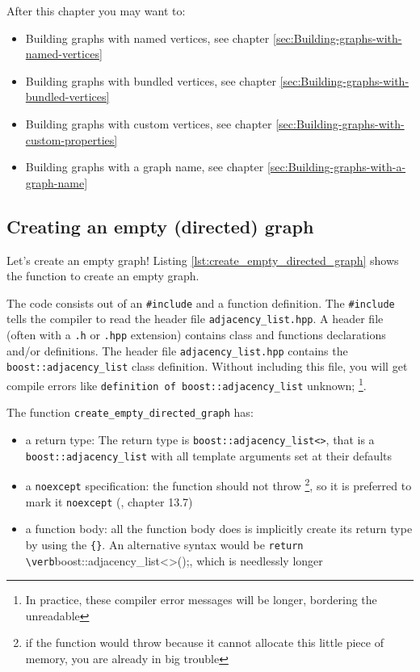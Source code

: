 After this chapter you may want to:

\begin{itemize}
  \item Building graphs with named vertices, 
    see chapter \ref{sec:Building-graphs-with-named-vertices}
  \item Building graphs with bundled vertices, 
    see chapter \ref{sec:Building-graphs-with-bundled-vertices}
  \item Building graphs with custom vertices,
    see chapter \ref{sec:Building-graphs-with-custom-properties}
  \item Building graphs with a graph name,
    see chapter \ref{sec:Building-graphs-with-a-graph-name}
\end{itemize}

\subsection{Creating an empty (directed) graph}
\label{subsec:create_empty_directed_graph}

Let's create an empty graph! 
Listing \ref{lst:create_empty_directed_graph} 
shows the function to create an empty graph.



The code consists out of an \verb;#include; and a function definition.
The \verb;#include; tells the compiler 
to read the header file \verb;adjacency_list.hpp;.
A header file (often with a \verb;.h; or \verb;.hpp; extension) 
contains class and functions declarations and/or definitions.
The header file \verb;adjacency_list.hpp; contains the 
\verb;boost::adjacency_list; class definition.
Without including this file, you will get compile errors like 
\verb;definition of boost::adjacency_list; unknown;
\footnote{
  In practice, these compiler error messages will be longer, bordering the unreadable
}. 

The function \verb;create_empty_directed_graph; has:

\begin{itemize}
  \item a return type: 
    The return type is \verb;boost::adjacency_list<>;, 
    that is a \verb;boost::adjacency_list; 
    with all template arguments set at their defaults
  \item a \verb;noexcept; specification: 
    the function should not throw
    \footnote{
      if the function would throw because it cannot allocate this little piece
      of memory, you are already in big trouble
    }, so it is preferred to mark it \verb;noexcept; 
    (\cite{stroustrup2013}, chapter 13.7)
  \item a function body: 
    all the function body does is implicitly create its return
    type by using the \verb;{};.
    An alternative syntax would be \verb;return \verb;boost::adjacency_list<>();, 
    which is needlessly longer
\end{itemize}

